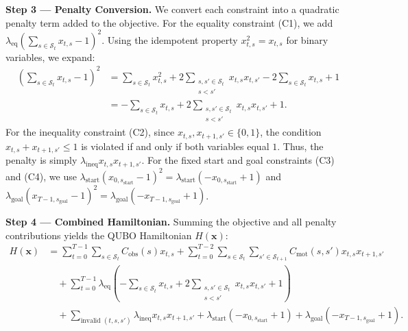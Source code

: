 \documentclass[12pt]{article}
\begin{document}
\textbf{Step 3 --- Penalty Conversion.} We convert each constraint into a quadratic penalty term added to the objective.
For the equality constraint (C1), we add $\lambda_{\text{eq}} \left( \sum_{s \in \mathcal{S}_t} x_{t,s} - 1 \right)^2$. Using the idempotent property $x_{t,s}^2 = x_{t,s}$ for binary variables, we expand:
\begin{align}
\left( \sum_{s \in \mathcal{S}_t} x_{t,s} - 1 \right)^2 &= \sum_{s \in \mathcal{S}_t} x_{t,s}^2 + 2 \sum_{\substack{s, s' \in \mathcal{S}_t \\ s < s'}} x_{t,s} x_{t,s'} - 2 \sum_{s \in \mathcal{S}_t} x_{t,s} + 1 \nonumber \\
&= -\sum_{s \in \mathcal{S}_t} x_{t,s} + 2 \sum_{\substack{s, s' \in \mathcal{S}_t \\ s < s'}} x_{t,s} x_{t,s'} + 1.
\end{align}
For the inequality constraint (C2), since $x_{t,s}, x_{t+1,s'} \in \{0,1\}$, the condition $x_{t,s} + x_{t+1,s'} \le 1$ is violated if and only if both variables equal $1$. Thus, the penalty is simply $\lambda_{\text{ineq}} x_{t,s} x_{t+1,s'}$.
For the fixed start and goal constraints (C3) and (C4), we use $\lambda_{\text{start}} (x_{0, s_{\text{start}}} - 1)^2 = \lambda_{\text{start}} (-x_{0, s_{\text{start}}} + 1)$ and $\lambda_{\text{goal}} (x_{T-1, s_{\text{goal}}} - 1)^2 = \lambda_{\text{goal}} (-x_{T-1, s_{\text{goal}}} + 1)$.

\textbf{Step 4 --- Combined Hamiltonian.} Summing the objective and all penalty contributions yields the QUBO Hamiltonian $H(\mathbf{x})$:
\begin{align}
H(\mathbf{x}) &= \sum_{t=0}^{T-1} \sum_{s \in \mathcal{S}_t} C_{\text{obs}}(s) x_{t,s} + \sum_{t=0}^{T-2} \sum_{s \in \mathcal{S}_t} \sum_{s' \in \mathcal{S}_{t+1}} C_{\text{mot}}(s,s') x_{t,s} x_{t+1,s'} \nonumber \\
&\quad + \sum_{t=0}^{T-1} \lambda_{\text{eq}} \left( -\sum_{s \in \mathcal{S}_t} x_{t,s} + 2 \sum_{\substack{s, s' \in \mathcal{S}_t \\ s < s'}} x_{t,s} x_{t,s'} + 1 \right) \nonumber \\
&\quad + \sum_{\text{invalid } (t,s,s')} \lambda_{\text{ineq}} x_{t,s} x_{t+1,s'} + \lambda_{\text{start}} (-x_{0, s_{\text{start}}} + 1) + \lambda_{\text{goal}} (-x_{T-1, s_{\text{goal}}} + 1).
\end{align}
\end{document}
